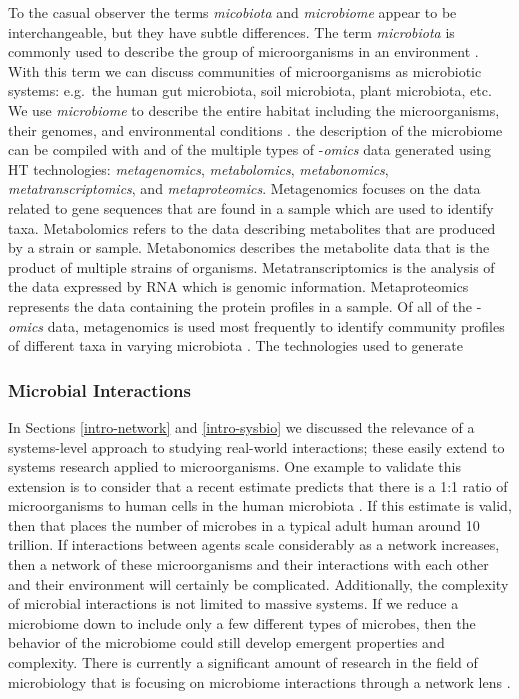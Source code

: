 To the casual observer the terms \textit{micobiota} and \textit{microbiome} appear to be interchangeable, but they have subtle differences. The term \textit{microbiota} is commonly used to describe the group of microorganisms in an environment \citep{Marchesi2015}. With this term we can discuss communities of microorganisms as microbiotic systems: e.g.\ the human gut microbiota, soil microbiota,  plant microbiota, etc. We use \textit{microbiome} to describe the entire habitat including the microorganisms, their genomes, and environmental conditions \citep{Marchesi2015}. the description of the microbiome can be compiled with and of the multiple types of -\textit{omics} data generated using \acrshort{HT} technologies: \textit{metagenomics}, \textit{metabolomics}, \textit{metabonomics}, \textit{metatranscriptomics}, and \textit{metaproteomics}. Metagenomics focuses on the data related to gene sequences that are found in a sample which are used to identify taxa.  Metabolomics refers to the data describing metabolites that are produced by a strain or sample. Metabonomics describes the metabolite data that is the product of multiple strains of organisms. Metatranscriptomics is the analysis of the data expressed by \acrfull{RNA} which is genomic information. Metaproteomics represents the data containing the protein profiles in a sample. Of all of the -\textit{omics} data, metagenomics is used most frequently to identify community profiles of different taxa in varying microbiota \citep{Knight2018}. The technologies used to generate 

\subsubsection{Microbial Interactions}\label{intro-mic-def}
In Sections \ref{intro-network} and \ref{intro-sysbio} we discussed the relevance of a systems-level approach to studying real-world interactions; these easily extend to systems research applied to microorganisms. One example to validate this extension is to consider that a recent estimate predicts that there is a 1:1 ratio of microorganisms to human cells in the human microbiota \citep{Sender2016}. If this estimate is valid, then that places the number of microbes in a typical adult human around 10 trillion. If interactions between agents scale considerably as a network increases, then a network of these microorganisms and their interactions with each other and their environment will certainly be complicated. Additionally, the complexity of microbial interactions is not limited to massive systems. If we reduce a microbiome down to include only a few different types of microbes, then the behavior of the microbiome could still develop emergent properties and complexity. There is currently a significant amount of research in the field of microbiology that is focusing on microbiome interactions through a network lens \citep{Layeghifard2017}.

